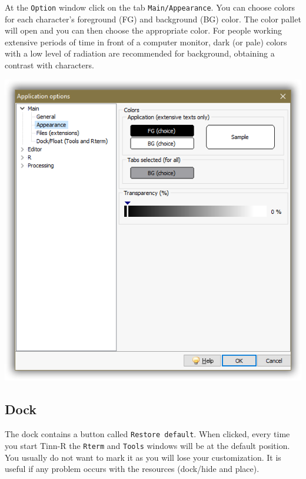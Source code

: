 At the \texttt{Option} window click on the tab \texttt{Main/Appearance}.
You can choose colors for each character's foreground (FG) and background (BG) color.
The color pallet will open and you can then choose the appropriate color.
For people working extensive periods of time in front of a computer monitor,
dark (or pale) colors with a low level of radiation are recommended for background,
obtaining a contrast with characters.

\includegraphics[scale=0.50]{./res/app_main_appearance.png}

\subsection{Dock}

The dock contains a button called \texttt{Restore default}.
When clicked, every time you start Tinn-R the \texttt{Rterm} and \texttt{Tools} windows will be at the default position.
You usually do not want to mark it as you will lose your customization.
It is useful if any problem occurs with the resources (dock/hide and place).

